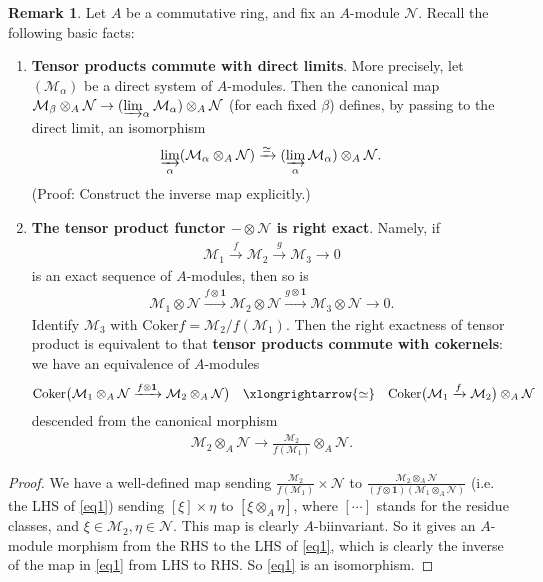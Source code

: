 \documentclass[12pt,b5paper,notitlepage]{report}
\theoremstyle{definition}
\newtheorem{rem}[df]{Remark}
\theoremstyle{plain}
\newcommand{\mc}{\mathcal}
\newcommand{\id}{\mathbf{1}}
\newcommand{\Cok}{\mathrm{Coker}}
\numberwithin{equation}{section}
\begin{document}
\begin{rem}\label{lb258}
Let $A$ be a commutative ring, and fix an $A$-module $\mc N$. Recall the following basic facts:
\begin{enumerate}[label=\arabic*.]
\item \textbf{Tensor products commute with direct limits}. More precisely, let $(\mc M_\alpha)$ be a direct system of $A$-modules. Then the canonical map $\mc M_\beta\otimes_A\mc N\rightarrow(\varinjlim_\alpha \mc M_\alpha)\otimes_A\mc N$ (for each fixed $\beta$) defines, by passing to the direct limit, an isomorphism
\begin{align}
\varinjlim_\alpha (\mc M_\alpha\otimes_A\mc N)\xrightarrow{\simeq} (\varinjlim_\alpha \mc M_\alpha)\otimes_A\mc N.
\end{align}
(Proof: Construct the inverse map explicitly.)
\item \textbf{The tensor product functor $-\otimes\mc N$ is right exact}.  Namely, if
\begin{align*}
\mc M_1\xrightarrow{f}\mc M_2\xrightarrow{g}\mc M_3\rightarrow0
\end{align*}
is an exact sequence of $A$-modules, then so is
\begin{align*}
\mc M_1\otimes\mc N\xrightarrow{f\otimes\id}\mc M_2\otimes\mc N\xrightarrow{g\otimes\id}\mc M_3\otimes\mc N\rightarrow 0.
\end{align*}
Identify $\mc M_3$ with $\Cok f=\mc M_2/f(\mc M_1)$. Then the right exactness of tensor product is equivalent to that \textbf{tensor products commute with cokernels}: we have an equivalence of $A$-modules
\begin{align}
\Cok\big(\mc M_1\otimes_A\mc N\xrightarrow{f\otimes\id}\mc M_2\otimes_A\mc N \big)\quad\xlongrightarrow{\simeq}\quad \Cok\big(\mc M_1\xrightarrow{f}\mc M_2\big)\otimes_A\mc N\label{eq1}
\end{align}
descended from the canonical morphism
\begin{align}
\mc M_2\otimes_A\mc N\longrightarrow \frac{\mc M_2}{f(\mc M_1)}\otimes_A\mc N.
\end{align}
\end{enumerate}
\hfill\qedsymbol
\end{rem}

\begin{proof}
We have a well-defined map sending $\frac{\mc M_2}{f(\mc M_1)}\times\mc N$ to $\frac{\mc M_2\otimes_A\mc N}{(f\otimes\id)(\mc M_1\otimes_A\mc N)}$ (i.e. the LHS of \eqref{eq1}) sending $[\xi]\times\eta$ to $[\xi\otimes_A\eta]$, where $[\cdots]$ stands for the residue classes, and $\xi\in\mc M_2,\eta\in\mc N$. This map is clearly $A$-biinvariant. So it gives an $A$-module morphism from the RHS to the LHS of \eqref{eq1}, which is clearly the inverse of the map in \eqref{eq1} from LHS to RHS. So \eqref{eq1} is an isomorphism.
\end{proof}
\end{document}
